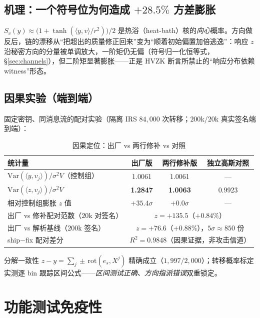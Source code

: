 \documentclass[11pt,a4paper]{ctexart}
\begin{document}
\subsection{机理：一个符号位为何造成 $+28.5\%$ 方差膨胀}

$S_v(y)\approx\bigl(1+\tanh(\langle y,v\rangle/r^2)\bigr)/2$ 是热浴（heat-bath）核的\emph{向心}概率。方向做反后，链的漂移从``把超出的质量修正回来''变为``顺着初始偏置加倍逃逸''：响应 $z$ 沿秘密方向的分量被单调放大，一阶矩仍无偏（符号归一化恒等式，\S\ref{sec:channels}），但二阶矩显著膨胀——正是 HVZK 断言所禁止的``响应分布依赖 witness''形态。

\subsection{因果实验（端到端）}

固定密钥、同消息流的配对实验（隔离 IRS $84{,}000$ 次转移；$200$k/$20$k 真实签名端到端）：

\begin{table}[h]\centering
\caption{因果定位：出厂 vs 两行修补 vs 对照}\label{tab:causal}
\begin{tabular}{lccc}
\toprule
统计量 & 出厂版 & 两行修补版 & 独立高斯对照\\
\midrule
$\mathrm{Var}(\langle y,v_j\rangle)/\sigma^2V$（控制组） & 1.0061 & 1.0061 & ---\\
$\mathrm{Var}(\langle z,v_j\rangle)/\sigma^2V$ & \textbf{1.2847} & \textbf{1.0063} & 0.9923\\
相对控制组膨胀 $z$ 值 & $+35.4\sigma$ & $+0.0\sigma$ & ---\\
\midrule
出厂 vs 修补配对范数（$20$k 对签名） & \multicolumn{3}{c}{$z=+135.5$（$+0.84\%$）}\\
出厂 vs 解析基线（$200$k 签名） & \multicolumn{3}{c}{$z=+76.6$（$+0.88\%$），$5\sigma\approx850$ 份}\\
ship$-$fix 配对差分 & \multicolumn{3}{c}{$R^2=0.9848$（因果证据，非攻击信道）}\\
\bottomrule
\end{tabular}
\end{table}

分解一致性 $z-y=\sum_j\pm\,\mathrm{rot}(e_s,X^j)$ 精确成立（$1{,}997/2{,}000$）；转移概率标定实测逐 bin 跟踪区间公式——\emph{区间测试正确、方向指派错误}双重锁定。

\section{功能测试免疫性}\label{sec:immune}
\end{document}
